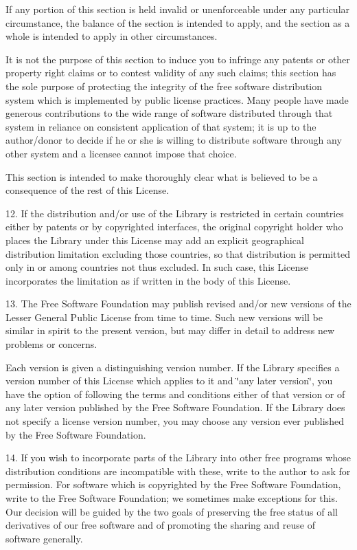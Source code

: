 If any portion of this section is held invalid or unenforceable under any particular circumstance, the balance of the section is intended to apply, and the section as a whole is intended to apply in other circumstances.

It is not the purpose of this section to induce you to infringe any patents or other property right claims or to contest validity of any such claims; this section has the sole purpose of protecting the integrity of the free software distribution system which is implemented by public license practices. Many people have made generous contributions to the wide range of software distributed through that system in reliance on consistent application of that system; it is up to the author/donor to decide if he or she is willing to distribute software through any other system and a licensee cannot impose that choice.

This section is intended to make thoroughly clear what is believed to be a consequence of the rest of this License.

12. If the distribution and/or use of the Library is restricted in certain countries either by patents or by copyrighted interfaces, the original copyright holder who places the Library under this License may add an explicit geographical distribution limitation excluding those countries, so that distribution is permitted only in or among countries not thus excluded. In such case, this License incorporates the limitation as if written in the body of this License.

13. The Free Software Foundation may publish revised and/or new versions of the Lesser General Public License from time to time. Such new versions will be similar in spirit to the present version, but may differ in detail to address new problems or concerns.

Each version is given a distinguishing version number. If the Library specifies a version number of this License which applies to it and \char`\"{}any later version\char`\"{}, you have the option of following the terms and conditions either of that version or of any later version published by the Free Software Foundation. If the Library does not specify a license version number, you may choose any version ever published by the Free Software Foundation.

14. If you wish to incorporate parts of the Library into other free programs whose distribution conditions are incompatible with these, write to the author to ask for permission. For software which is copyrighted by the Free Software Foundation, write to the Free Software Foundation; we sometimes make exceptions for this. Our decision will be guided by the two goals of preserving the free status of all derivatives of our free software and of promoting the sharing and reuse of software generally.

